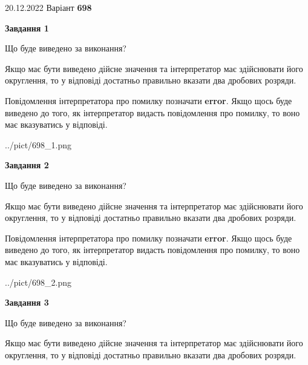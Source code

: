 \documentclass[12pt, ukrainian]{article}
\begin{document}
{20.12.2022 Варіант \No \textbf { 698 }\par}
{
\begin {Large}

{\begin {center}\textbf{Завдання 1}\end {center}}\par
Що буде виведено за виконання? \par

Якщо має бути виведено дійсне значення та інтерпретатор має здійснювати його округлення, 
то у відповіді достатньо правильно вказати два дробових розряди.

Повідомлення інтерпретатора про помилку позначати \textbf{error}.
Якщо щось буде виведено до того, як інтерпретатор видасть повідомлення про помилку, 
то воно має вказуватись у відповіді. \par

\begin{center}
	{../pict/698_1.png}
\end{center}
\newpage

{\begin {center}\textbf{Завдання 2}\end {center}}\par
Що буде виведено за виконання? \par

Якщо має бути виведено дійсне значення та інтерпретатор має здійснювати його округлення, 
то у відповіді достатньо правильно вказати два дробових розряди.

Повідомлення інтерпретатора про помилку позначати \textbf{error}.
Якщо щось буде виведено до того, як інтерпретатор видасть повідомлення про помилку, 
то воно має вказуватись у відповіді. \par

\begin{center}
	{../pict/698_2.png}
\end{center}
\newpage

{\begin {center}\textbf{Завдання 3}\end {center}}\par
Що буде виведено за виконання? \par

Якщо має бути виведено дійсне значення та інтерпретатор має здійснювати його округлення, 
то у відповіді достатньо правильно вказати два дробових розряди.


\end{Large}}
\end{document}
